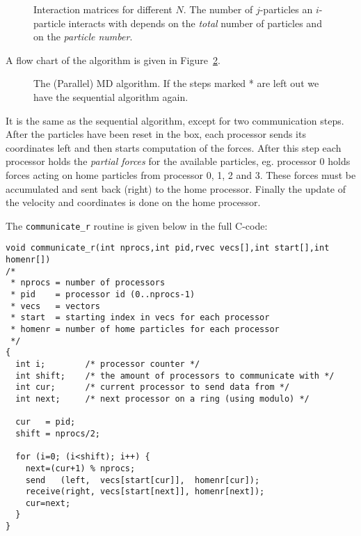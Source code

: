 \begin {figure}
\centerline{}
\caption[Interaction matrices for different $N$.]{Interaction matrices for different $N$. The number of $j$-particles an $i$-particle interacts with depends on the {\em total} number of particles and on the {\em particle number}.}
\label{Fig:decomp}
\end {figure}

A flow chart of the algorithm is given in Figure~\ref{Fig:mdpar}.
\begin {figure}
\centerline{}
\caption {The (Parallel) MD algorithm. If the steps marked * are left out we have the sequential algorithm again.}
\label{Fig:mdpar}
\end {figure}
It is the same as the sequential algorithm, except for two communication
steps. After the particles have been reset in the box, each processor
sends its coordinates left and then starts computation of the forces.
After this step each processor holds the {\em partial forces} for the 
available particles, eg. processor 0 holds forces acting on home particles
from processor 0, 1, 2 and 3. These forces must be accumulated and sent back
(right) to the home processor. Finally the update of the velocity and 
coordinates is done on the home processor. 

The {\tt communicate\_r} routine is given below in the full C-code:
\begin{footnotesize}
\begin{verbatim}
void communicate_r(int nprocs,int pid,rvec vecs[],int start[],int homenr[])
/* 
 * nprocs = number of processors
 * pid    = processor id (0..nprocs-1)
 * vecs   = vectors
 * start  = starting index in vecs for each processor
 * homenr = number of home particles for each processor
 */
{
  int i;        /* processor counter */
  int shift;    /* the amount of processors to communicate with */
  int cur;      /* current processor to send data from */
  int next;     /* next processor on a ring (using modulo) */

  cur   = pid;
  shift = nprocs/2;

  for (i=0; (i<shift); i++) {
    next=(cur+1) % nprocs;	
    send   (left,  vecs[start[cur]],  homenr[cur]);
    receive(right, vecs[start[next]], homenr[next]);
    cur=next;
  }
}
\end{verbatim}

\end{footnotesize}

